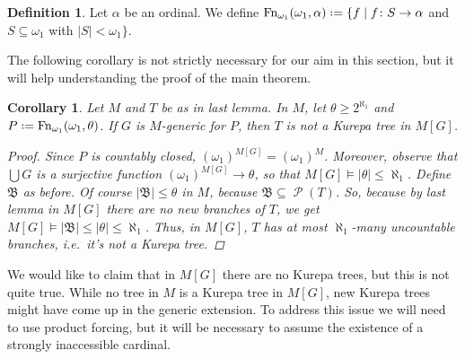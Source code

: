 \documentclass[11pt,a4paper]{report}
\newtheorem{corollary}[theorem]{Corollary} %
\theoremstyle{definition}
\newtheorem{defn}[theorem]{Definition}
\theoremstyle{num.custom-title}
\theoremstyle{custom-title}
\DeclareMathOperator{\PP}{\mathcal{P}}
\DeclareMathOperator{\sse}{\subseteq}
\DeclareMathOperator{\Fn}{Fn}
\newcommand*{\defeq}{\mathrel{\rlap{%
                     \raisebox{0.3ex}{$\cdot$}}%
                     \raisebox{-0.3ex}{$\cdot$}}%
                     =}
\begin{document}
\begin{defn}
Let $\alpha$ be an ordinal. We define $\Fn_{\omega_1}(\omega_1,\alpha) \defeq \{ f \mid f \colon S \to \alpha$ and $S \sse \omega_1$ with $|S| < \omega_1\}$.
\end{defn}

The following corollary is not strictly necessary for our aim in this section, but it will help understanding the proof of the main theorem.

\begin{corollary}
Let $M$ and $T$ be as in last lemma. In $M$, let $\theta \geq 2^{\aleph_1}$ and $P \defeq \Fn_{\omega_1} (\omega_1,\theta)$. If $G$ is $M$-generic for $P$, then $T$ is not a Kurepa tree in $M[G]$.
\begin{proof}
Since $P$ is countably closed, $(\omega_1)^{M[G]} = (\omega_1)^M$. Moreover, observe that $\bigcup G$ is a surjective function $(\omega_1)^{M[G]} \to \theta$, so that $M[G] \models |\theta| \leq \aleph_1$. Define $\mathfrak{B}$ as before. Of course $|\mathfrak{B}| \leq \theta$ in $M$, because $\mathfrak{B} \sse \PP(T)$. So, because by last lemma in $M[G]$ there are no new branches of $T$, we get $M[G] \models |\mathfrak{B}| \leq |\theta| \leq \aleph_1$. Thus, in $M[G]$, $T$ has at most $\aleph_1$-many uncountable branches, i.e.\ it's not a Kurepa tree.
\end{proof}
\end{corollary}

We would like to claim that in $M[G]$ there are no Kurepa trees, but this is not quite true. While no tree in $M$ is a Kurepa tree in $M[G]$, new Kurepa trees might have come up in the generic extension. To address this issue we will need to use product forcing, but it will be necessary to assume the existence of a strongly inaccessible cardinal.
\end{document}
